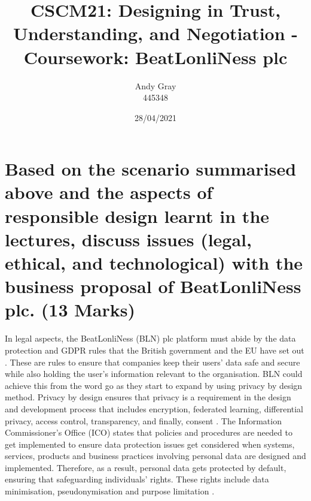 \documentclass[a4paper,10pt]{article}
\begin{document}
\title{CSCM21: Designing in Trust, Understanding, and Negotiation - Coursework: BeatLonliNess plc}
\author{Andy Gray\\445348}
\date{28/04/2021}

\maketitle

\section{Based on the scenario summarised above and the aspects of responsible design learnt in the lectures, discuss issues (legal, ethical, and technological) with the business proposal of BeatLonliNess plc. (13 Marks)}
\label{sec:intro}

	In legal aspects, the BeatLonliNess (BLN) plc platform must abide by the data protection and GDPR rules that the British government and the EU have set out \cite{gdpr}. These are rules to ensure that companies keep their users' data safe and secure while also holding the user's information relevant to the organisation. BLN could achieve this from the word go as they start to expand by using privacy by design method. Privacy by design ensures that privacy is a requirement in the design and development process that includes encryption, federated learning, differential privacy, access control, transparency, and finally, consent \cite{berte_slides_ai_law_overview}. The Information Commissioner's Office (ICO) states that policies and procedures are needed to get implemented to ensure data protection issues get considered when systems, services, products and business practices involving personal data are designed and implemented. Therefore, as a result, personal data gets protected by default, ensuring that safeguarding individuals' rights. These rights include data minimisation, pseudonymisation and purpose limitation \cite{ico_website}. 
\end{document}
